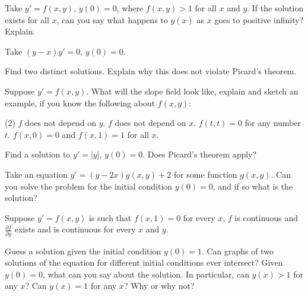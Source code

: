 \begin{exercise}[challenging]
Take $y' = f(x,y)$, $y(0) = 0$, where $f(x,y) > 1$
for all $x$ and $y$.  If
the solution exists for all $x$, can you say
what happens to $y(x)$ as $x$ goes to positive infinity?  Explain.
\end{exercise}

\begin{exercise}[challenging]
Take $(y-x)y' = 0$, $y(0) = 0$.
\begin{tasks}
\task Find two distinct solutions.
\task Explain why this does not violate Picard's theorem.  
\end{tasks}
\end{exercise}

\begin{exercise}
Suppose $y' = f(x,y)$.  What will the slope field look like, explain and
sketch an example, if you know the following about $f(x,y)$:
\begin{tasks}(2)
\task $f$ does
not depend on $y$.
\task $f$ does not depend on $x$.
\task $f(t,t) = 0$ for any
number $t$.
\task $f(x,0) = 0$ and $f(x,1) = 1$ for all $x$.
\end{tasks}
\end{exercise}

\begin{exercise}
Find a solution to $y' = \lvert y \rvert$, $y(0) = 0$.  Does Picard's theorem apply?
\end{exercise}

\begin{exercise}
Take an equation $y' = (y-2x) g(x,y) + 2$ for some function $g(x,y)$.
Can you solve the problem for the
initial condition $y(0) = 0$,
and if so what is the solution?
\end{exercise}

\begin{exercise}[challenging]
\pagebreak[2]
Suppose $y' = f(x,y)$ is such that $f(x,1) = 0$ for every $x$,
$f$ is continuous and $\frac{\partial f}{\partial y}$ exists and
is continuous for every $x$ and $y$.
\begin{tasks}
\task
Guess a solution given the initial condition
$y(0) = 1$.
\task
Can graphs of two solutions of the equation for different initial conditions
ever intersect?
\task
Given $y(0) = 0$, what can you say about the solution.  In particular,
can $y(x) > 1$ for any $x$?  Can $y(x) = 1$ for any $x$?  Why or why not?
\end{tasks}
\end{exercise}

